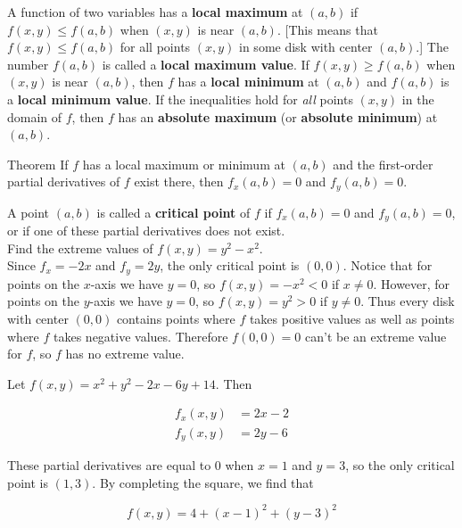         A function of two variables has a \textbf{local maximum} at $(a,b)$ if $f(x,y) \leq f(a,b)$ when $(x,y)$ is near $(a,b)$. [This means that $f(x,y) \leq f(a,b)$ for all points $(x,y)$ in some disk with center
        $(a,b)$.] The number $f(a,b)$ is called a \textbf{local maximum value}. If $f(x,y) \geq f(a,b)$ when $(x,y)$ is near $(a,b)$, then $f$ has a \textbf{local minimum} at $(a,b)$ and $f(a,b)$ is a
        \textbf{local minimum value}. If the inequalities hold for \textit{all} points $(x,y)$ in the domain of $f$, then $f$ has an \textbf{absolute maximum} (or \textbf{absolute minimum}) at $(a,b)$.

        \begin{theorem}{Theorem}
            If $f$ has a local maximum or minimum at $(a,b)$ and the first-order partial derivatives of $f$ exist there, then $f_x (a,b) = 0$ and $f_y (a,b) = 0$.
        \end{theorem}

        A point $(a,b)$ is called a \textbf{critical point} of $f$ if $f_x (a,b) = 0$ and $f_y (a,b) = 0$, or if one of these partial derivatives does not exist. \\

        \textit{} Find the extreme values of $f(x,y) = y^2 - x^2$. \\

        Since $f_x = -2x$ and $f_y = 2y$, the only critical point is $(0,0)$. Notice that for points on the $x$-axis we have $y=0$, so $f(x,y) = -x^2 < 0$ if $x\not = 0$. However, for points on the $y$-axis we have
        $y=0$, so $f(x,y) = y^2 > 0$ if $y\not = 0$. Thus every disk with center $(0,0)$ contains points where $f$ takes positive values as well as points where $f$ takes negative values. Therefore $f(0,0) = 0$ can't
        be an extreme value for $f$, so $f$ has no extreme value.

        \textit{} Let $f(x,y) = x^2 + y^2 - 2x - 6y + 14$. Then

        \begin{align*}
            f_x (x,y)   &= 2x -2 \\
            f_y (x,y)   &= 2y - 6
        \end{align*}

        These partial derivatives are equal to 0 when $x=1$ and $y=3$, so the only critical point is $(1,3)$. By completing the square, we find that

        \[
            f(x,y) = 4 + (x-1)^2 + (y-3)^2
        \]

